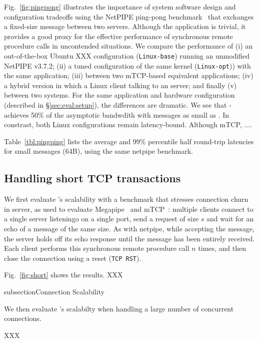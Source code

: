 Fig.~\ref{fig:pingpong} illustrates the importance of system software
design and configuration tradeoffs using the NetPIPE ping-pong
benchmark~\cite{snell1996netpipe} that exchanges a fixed-size message
between two servers.  Although the application is trivial, it provides
a good proxy for the effective performance of synchronous remote
procedure calls in uncontended situations.  We compare the performance
of (i) an out-of-the-box Ubuntu XXX configuration
(\texttt{Linux-base}) running an unmodified NetPIPE v3.7.2; (ii) a
tuned configuration of the same kernel (\texttt{Linux-opt})) with the
same application; (iii) between two mTCP-based equivalent
applications; (iv) a hybrid version in which a Linux client talking to
an \ix server; and finally (v) between two \ix systems.  For the same
application and hardware configuration (described in
\S\ref{sec:eval:setup}), the differences are dramatic.  We see that
\ix-\ix achieves 50\% of the asymptotic bandwdith with messages as small
as .  In constrast, both Linux configurations remain
latency-bound.  Although mTCP, ....


Table~\ref{tbl:pingping} lists the average and 99\% percentile half
round-trip latencies for small messages (64B), using the same netpipe
benchmark.  

\subsection{Handling short TCP transactions}



We first evaluate \ix's scalability with a benchmark that stresses
connection churn in server, as used to evaluate
Megapipe~\cite{han2012megapipe} and mTCP~\cite{jeong2014mtcp}:
multiple clients connect to a single server listeningo on a single
port, send a request of size $s$ and wait for an echo of a message of
the same size.  As with netpipe, while accepting the message, the server holds off its
echo response until the message has been entirely received.
Each client performs this synchronous remote procedure
call $n$ times, and then close the connection using a reset
(\texttt{TCP RST}).

Fig.~\ref{fig:short} shows the results. XXX


subsection{Connection Scalability}

We then evaluate \ix's scalabilty when handling a large number of concurrent connections. 

XXX


